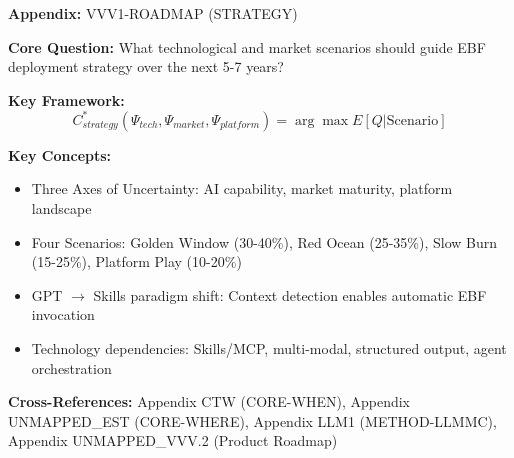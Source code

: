 \begin{tcolorbox}[colback=blue!5!white, colframe=blue!75!black,
    title=Quick Reference: Technological Roadmap]
\textbf{Appendix:} VVV1-ROADMAP (STRATEGY)


\textbf{Core Question:} What technological and market scenarios should guide
EBF deployment strategy over the next 5-7 years?

\textbf{Key Framework:}
\begin{equation}
C^*_{strategy}(\Psi_{tech}, \Psi_{market}, \Psi_{platform}) = \arg\max E[Q | \text{Scenario}]
\end{equation}

\textbf{Key Concepts:}
\begin{itemize}[nosep]
\item Three Axes of Uncertainty: AI capability, market maturity, platform landscape
\item Four Scenarios: Golden Window (30-40\%), Red Ocean (25-35\%), Slow Burn (15-25\%), Platform Play (10-20\%)
\item GPT $\to$ Skills paradigm shift: Context detection enables automatic EBF invocation
\item Technology dependencies: Skills/MCP, multi-modal, structured output, agent orchestration
\end{itemize}

\textbf{Cross-References:} Appendix CTW (CORE-WHEN), Appendix UNMAPPED_EST (CORE-WHERE),
Appendix LLM1 (METHOD-LLMMC), Appendix UNMAPPED_VVV.2 (Product Roadmap)
\end{tcolorbox}


